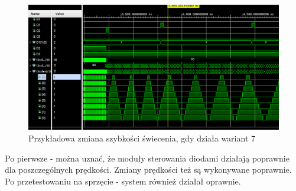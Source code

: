 \documentclass{article}
\begin{document}
\begin{figure} [H]
	\begin{center}
			\includegraphics[width = \textwidth]{zmiana2.png}
			\caption{Przykładowa zmiana szybkości świecenia, gdy działa wariant 7}
\end{center}
\end{figure}

Po pierwsze - można uznać, że moduły sterowania diodami działają poprawnie dla poszczególnych prędkości. Zmiany prędkości też są wykonywane poprawnie. Po przetestowaniu na sprzęcie - system również działał oprawnie.
\end{document}
